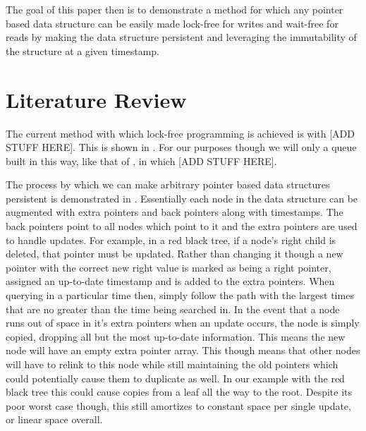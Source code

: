 \documentclass[11pt]{article}       %
\begin{document}
The goal of this paper then is to demonstrate a method for which any pointer based data structure
can be easily made lock-free for writes and wait-free for reads by making the data structure persistent
and leveraging the immutability of the structure at a given timestamp.


\section{Literature Review} \label{litrev}

The current method with which lock-free programming is achieved is with [ADD STUFF HERE]. This is 
shown in \cite{ABC07}. For our purposes though we will only a queue built in this way, like that of 
\cite{AB91}, in which [ADD STUFF HERE].

The process by which we can make arbitrary pointer based data structures persistent is demonstrated
in \cite{DSST89}. Essentially each node in the data structure can be augmented with extra pointers and
back pointers along with timestamps. The back pointers point to all nodes which point to it and the extra
pointers are used to handle updates. For example, in a red black tree, if a node's right child is deleted,
that pointer must be updated. Rather than changing it though a new pointer with the correct new right value
is marked as being a right pointer, assigned an up-to-date timestamp and is added to the extra pointers.
When querying in a particular time then, simply follow the path with the largest times that are no greater
than the time being searched in. In the event that a node runs out of space in it's extra pointers when an
update occurs, the node is simply copied, dropping all but the most up-to-date information. This means the
new node will have an empty extra pointer array. This though means that other nodes will have to relink to
this node while still maintaining the old pointers which could potentially cause them to duplicate as well.
In our example with the red black tree this could cause copies from a leaf all the way to the root. Despite
its poor worst case though, this still amortizes to constant space per single update, or linear space overall.




\end{document}
